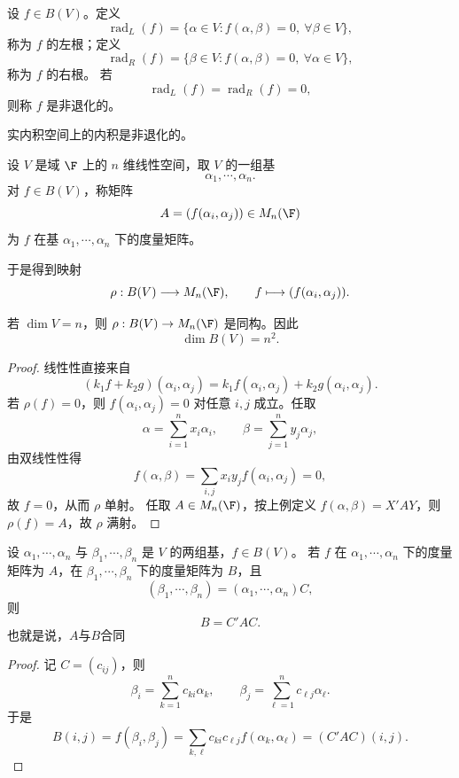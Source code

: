 \begin{definition}[根与非退化]
	设 $f\in B(V)$。定义
	\[
	\operatorname{rad}_L(f)=\{\alpha\in V:f(\alpha,\beta)=0,\ \forall \beta\in V\},
	\]
	称为 $f$ 的左根；定义
	\[
	\operatorname{rad}_R(f)=\{\beta\in V:f(\alpha,\beta)=0,\ \forall \alpha\in V\},
	\]
	称为 $f$ 的右根。
	若
	\[
	\operatorname{rad}_L(f)=\operatorname{rad}_R(f)=0,
	\]
	则称 $f$ 是非退化的。
\end{definition}

实内积空间上的内积是非退化的。

\begin{definition}[度量矩阵]
	设 $V$ 是域 $\F$ 上的 $n$ 维线性空间，取 $V$ 的一组基
	\[
	\alpha_1,\cdots,\alpha_n.
	\]
	对 $f\in B(V)$，称矩阵
	\[
	A=(f(\alpha_i,\alpha_j))\in M_n(\F)
	\]
	为 $f$ 在基 $\alpha_1,\cdots,\alpha_n$ 下的度量矩阵。
\end{definition}

于是得到映射
\[
\rho:B(V)\longrightarrow M_n(\F),
\qquad
f\longmapsto (f(\alpha_i,\alpha_j)).
\]

\begin{lemma}
	若 $\dim V=n$，则 $\rho:B(V)\to M_n(\F)$ 是同构。因此
	\[
	\dim B(V)=n^2.
	\]
\end{lemma}

\begin{proof}
	线性性直接来自
	\[
	(k_1f+k_2g)(\alpha_i,\alpha_j)
	=k_1f(\alpha_i,\alpha_j)+k_2g(\alpha_i,\alpha_j).
	\]
	若 $\rho(f)=0$，则 $f(\alpha_i,\alpha_j)=0$ 对任意 $i,j$ 成立。任取
	\[
	\alpha=\sum_{i=1}^n x_i\alpha_i,
	\qquad
	\beta=\sum_{j=1}^n y_j\alpha_j,
	\]
	由双线性性得
	\[
	f(\alpha,\beta)=\sum_{i,j}x_iy_jf(\alpha_i,\alpha_j)=0,
	\]
	故 $f=0$，从而 $\rho$ 单射。
	任取 $A\in M_n(\F)$，按上例定义 $f(\alpha,\beta)=X'AY$，则 $\rho(f)=A$，故 $\rho$ 满射。
\end{proof}

\begin{lemma}[度量矩阵的基变换]
	设 $\alpha_1,\cdots,\alpha_n$ 与 $\beta_1,\cdots,\beta_n$ 是 $V$ 的两组基，$f\in B(V)$。
	若 $f$ 在 $\alpha_1,\cdots,\alpha_n$ 下的度量矩阵为 $A$，在 $\beta_1,\cdots,\beta_n$ 下的度量矩阵为 $B$，且
	\[
	(\beta_1,\cdots,\beta_n)=(\alpha_1,\cdots,\alpha_n)C,
	\]
	则
	\[
	B=C'AC.
	\]
	也就是说，$A$与$B$合同
\end{lemma}

\begin{proof}
	记 $C=(c_{ij})$，则
	\[
	\beta_i=\sum_{k=1}^n c_{ki}\alpha_k,
	\qquad
	\beta_j=\sum_{\ell=1}^n c_{\ell j}\alpha_\ell.
	\]
	于是
	\[
	B(i,j)=f(\beta_i,\beta_j)
	=\sum_{k,\ell}c_{ki}c_{\ell j}f(\alpha_k,\alpha_\ell)
	=(C'AC)(i,j).
	\]
\end{proof}

